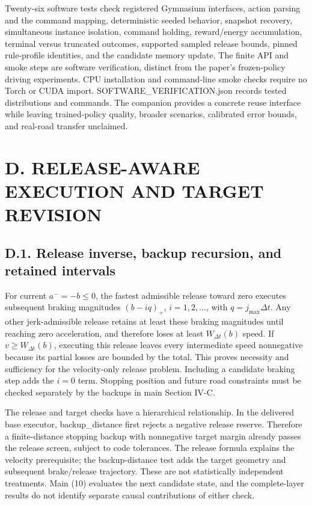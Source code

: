 \documentclass[letterpaper,journal,onecolumn]{IEEEtran}
\begin{document}
Twenty-six software tests check registered Gymnasium interfaces, action parsing and the command mapping, deterministic seeded behavior, snapshot recovery, simultaneous instance isolation, command holding, reward/energy accumulation, terminal versus truncated outcomes, supported sampled release bounds, pinned rule-profile identities, and the candidate memory update. The finite API and smoke steps are software verification, distinct from the paper's frozen-policy driving experiments. CPU installation and command-line smoke checks require no Torch or CUDA import. SOFTWARE\_VERIFICATION.json records tested distributions and commands. The companion provides a concrete reuse interface while leaving trained-policy quality, broader scenarios, calibrated error bounds, and real-road transfer unclaimed.

\FloatBarrier{}\section*{D. RELEASE-AWARE EXECUTION AND TARGET REVISION}\setcounter{subsection}{0}

\subsection*{D.1. Release inverse, backup recursion, and retained intervals}

For current \(a^-=-b\le0\), the fastest admissible release toward zero executes subsequent braking magnitudes \((b-iq)_+\), \(i=1,2,\ldots\), with \(q=j_{\max}\Delta t\). Any other jerk-admissible release retains at least these braking magnitudes until reaching zero acceleration, and therefore loses at least \(W_{\Delta t}(b)\) speed. If \(v\ge W_{\Delta t}(b)\), executing this release leaves every intermediate speed nonnegative because its partial losses are bounded by the total. This proves necessity and sufficiency for the velocity-only release problem. Including a candidate braking step adds the \(i=0\) term. Stopping position and future road constraints must be checked separately by the backups in main Section IV-C.

The release and target checks have a hierarchical relationship. In the delivered base executor, backup\_distance first rejects a negative release reserve. Therefore a finite-distance stopping backup with nonnegative target margin already passes the release screen, subject to code tolerances. The release formula explains the velocity prerequisite; the backup-distance test adds the target geometry and subsequent brake/release trajectory. These are not statistically independent treatments. Main (10) evaluates the next candidate state, and the complete-layer results do not identify separate causal contributions of either check.
\end{document}
